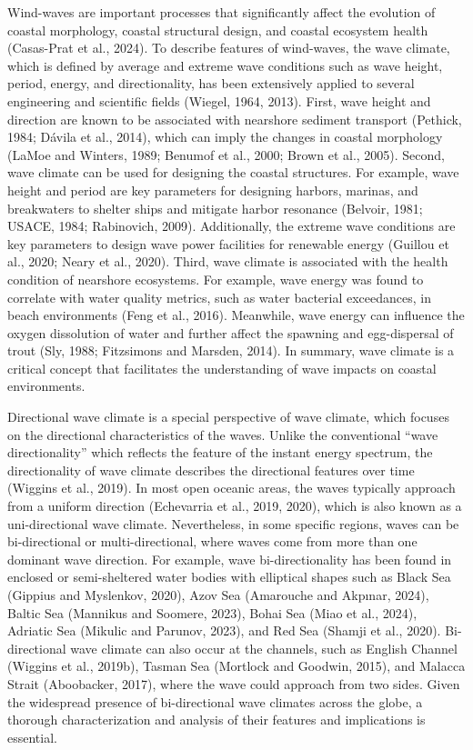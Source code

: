 Wind-waves are important processes that significantly affect the evolution of coastal morphology, coastal structural design, and coastal ecosystem health (Casas-Prat et al., 2024). To describe features of wind-waves, the wave climate, which is defined by average and extreme wave conditions such as wave height, period, energy, and directionality, has been extensively applied to several engineering and scientific fields (Wiegel, 1964, 2013). First, wave height and direction are known to be associated with nearshore sediment transport (Pethick, 1984; Dávila et al., 2014), which can imply the changes in coastal morphology (LaMoe and Winters, 1989; Benumof et al., 2000; Brown et al., 2005). Second, wave climate can be used for designing the coastal structures. For example, wave height and period are key parameters for designing harbors, marinas, and breakwaters to shelter ships and mitigate harbor resonance (Belvoir, 1981; USACE, 1984; Rabinovich, 2009). Additionally, the extreme wave conditions are key parameters to design wave power facilities for renewable energy (Guillou et al., 2020; Neary et al., 2020). Third, wave climate is associated with the health condition of nearshore ecosystems. For example, wave energy was found to correlate with water quality metrics, such as water bacterial exceedances, in beach environments (Feng et al., 2016). Meanwhile, wave energy can influence the oxygen dissolution of water and further affect the spawning and egg-dispersal of trout (Sly, 1988; Fitzsimons and Marsden, 2014). In summary, wave climate is a critical concept that facilitates the understanding of wave impacts on coastal environments.

Directional wave climate is a special perspective of wave climate, which focuses on the directional characteristics of the waves. Unlike the conventional “wave directionality” which reflects the feature of the instant energy spectrum, the directionality of wave climate describes the directional features over time (Wiggins et al., 2019). In most open oceanic areas, the waves typically approach from a uniform direction (Echevarria et al., 2019, 2020), which is also known as a uni-directional wave climate. Nevertheless, in some specific regions, waves can be bi-directional or multi-directional, where waves come from more than one dominant wave direction. For example, wave bi-directionality has been found in enclosed or semi-sheltered water bodies with elliptical shapes such as Black Sea (Gippius and Myslenkov, 2020), Azov Sea (Amarouche and Akpınar, 2024), Baltic Sea (Mannikus and Soomere, 2023), Bohai Sea (Miao et al., 2024), Adriatic Sea (Mikulic and Parunov, 2023), and Red Sea (Shamji et al., 2020). Bi-directional wave climate can also occur at the channels, such as English Channel (Wiggins et al., 2019b), Tasman Sea (Mortlock and Goodwin, 2015), and Malacca Strait (Aboobacker, 2017), where the wave could approach from two sides. Given the widespread presence of bi-directional wave climates across the globe, a thorough characterization and analysis of their features and implications is essential.


